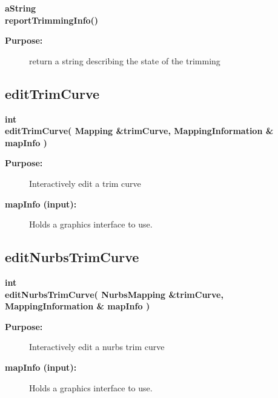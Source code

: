\begin{flushleft} \textbf{%
aString  \\ 
\settowidth{\TrimmedMappingIncludeArgIndent}{reportTrimmingInfo(}%
reportTrimmingInfo() 
}\end{flushleft}
\begin{description}
\item[{\bf Purpose:}]  return a string describing the state of the trimming
\end{description}
\subsection{editTrimCurve}
 
\begin{flushleft} \textbf{%
int  \\ 
\settowidth{\TrimmedMappingIncludeArgIndent}{editTrimCurve(}%
editTrimCurve( Mapping \&trimCurve, MappingInformation \& mapInfo ) 
}\end{flushleft}
\begin{description}
\item[{\bf Purpose:}]  Interactively edit a trim curve
\item[{\bf mapInfo (input):}]  Holds a graphics interface to use.
\end{description}
\subsection{editNurbsTrimCurve}
 
\begin{flushleft} \textbf{%
int  \\ 
\settowidth{\TrimmedMappingIncludeArgIndent}{editNurbsTrimCurve(}%
editNurbsTrimCurve( NurbsMapping \&trimCurve, MappingInformation \& mapInfo ) 
}\end{flushleft}
\begin{description}
\item[{\bf Purpose:}]  Interactively edit  a nurbs trim curve
\item[{\bf mapInfo (input):}]  Holds a graphics interface to use.
\end{description}
